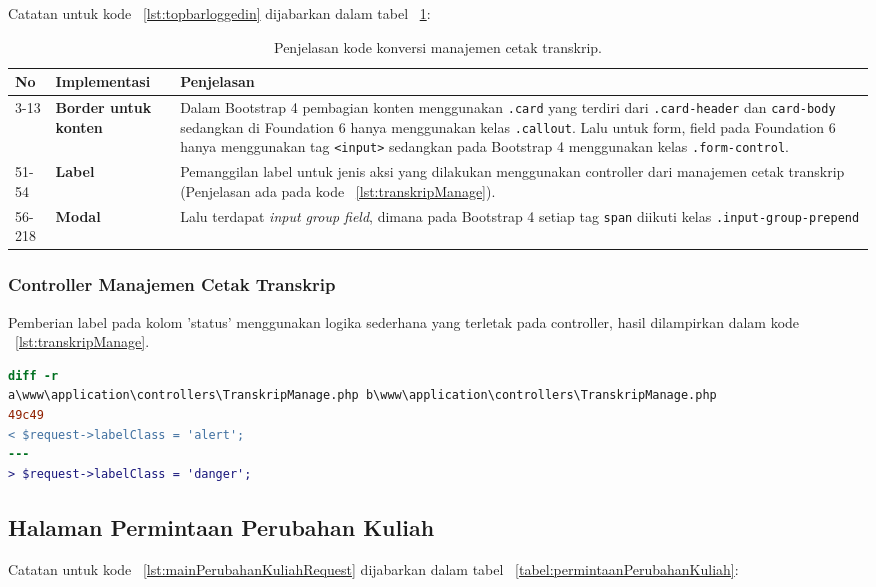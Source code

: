 \noindent Catatan untuk kode ~\ref{lst:topbarloggedin} dijabarkan dalam tabel ~\ref{tabel:KodeManajemenCetakTranskrip}:
\begin{table}[H]
	\centering
	\caption{Penjelasan kode konversi manajemen cetak transkrip.}
	\begin{tabularx}{\textwidth}{llX}
		\toprule
		No & Implementasi     & Penjelasan \\
		\midrule
		3-13 & \textbf{Border untuk konten} & Dalam Bootstrap 4 pembagian konten menggunakan \texttt{.card} yang terdiri dari \texttt{.card-header} dan \texttt{card-body} sedangkan di Foundation 6 hanya menggunakan kelas \texttt{.callout}. Lalu untuk form, field pada Foundation 6 hanya menggunakan tag \texttt{<input>} sedangkan pada Bootstrap 4 menggunakan kelas \texttt{.form-control}.\\
		51-54 & \textbf{Label}  & Pemanggilan label untuk jenis aksi yang dilakukan menggunakan controller dari manajemen cetak transkrip (Penjelasan ada pada kode ~\ref{lst:transkripManage}).\\
		56-218 & \textbf{Modal}  & Lalu terdapat \textit{input group field}, dimana pada Bootstrap 4 setiap tag \texttt{span} diikuti kelas \texttt{.input-group-prepend}\\
		\bottomrule
	\end{tabularx}%
	\label{tabel:KodeManajemenCetakTranskrip}
\end{table}

\subsubsection{Controller Manajemen Cetak Transkrip}
Pemberian label pada kolom 'status' menggunakan logika sederhana yang terletak pada controller, hasil dilampirkan dalam kode ~\ref{lst:transkripManage}.
\begin{lstlisting}[language=diff, caption=Controller Manajemen Cetak Transkrip,  basicstyle=\ttfamily, frame=single,
columns=fullflexible, keepspaces=true, breaklines=true, label={lst:transkripManage}]
diff -r 
a\www\application\controllers\TranskripManage.php b\www\application\controllers\TranskripManage.php
49c49
< $request->labelClass = 'alert';
---
> $request->labelClass = 'danger';

\end{lstlisting}

\subsection{Halaman Permintaan Perubahan Kuliah}
\noindent Catatan untuk kode ~\ref{lst:mainPerubahanKuliahRequest} dijabarkan dalam tabel ~\ref{tabel:permintaanPerubahanKuliah}:

